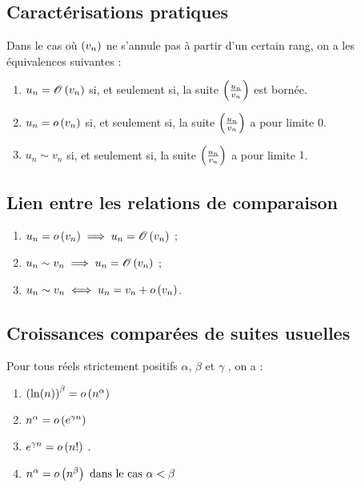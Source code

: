 \subsection{Caractérisations pratiques}
\begin{defprop}
    Dans le cas où \(\left(v_n\right)\) ne s’annule pas à partir d’un certain rang, on a les équivalences suivantes :
    \begin{enumerate}
        \item \(u_n = \mathscr{O}\left(v_n\right)\) si, et seulement si, la suite \(\left(\frac{u_n}{v_n}\right)\) est bornée.
        \item \(u_n = o\left(v_n\right)\) si, et seulement si, la suite \(\left(\frac{u_n}{v_n}\right)\) a pour limite \(0\).
        \item  \(u_n \sim v_n\) si, et seulement si, la suite \(\left(\frac{u_n}{v_n}\right)\) a pour limite \(1\).
    \end{enumerate}
\end{defprop}

\subsection{Lien entre les relations de comparaison}
\begin{defprop}
    \begin{enumerate}
        \item \(u_n = o\left(v_n\right) \implies  u_n = \mathscr{O}\left(v_n\right)\) ;
        \item \(u_n \sim v_n \implies  u_n = \mathscr{O}\left(v_n\right)\) ;
        \item \(u_n \sim v_n \iff u_n = v_n + o\left(v_n\right)\).
    \end{enumerate}
\end{defprop}

\subsection{Croissances comparées de suites usuelles}
\begin{defprop}
    Pour tous réels strictement positifs \(\alpha\), \(\beta\) et \(\gamma\) , on a :
    \begin{enumerate}
        \item \(\left(\ln(n)\right)^{\beta} = o\left(n^{\alpha}\right)\)
        \item \(n^{\alpha} = o\left(e^{\gamma n}\right)\)
        \item \(e^{\gamma n} = o\left(n!\right)\) .
        \item \(n^{\alpha} = o\left(n^{\beta}\right)\text{ dans le cas }\alpha < \beta\)
    \end{enumerate}
\end{defprop}

